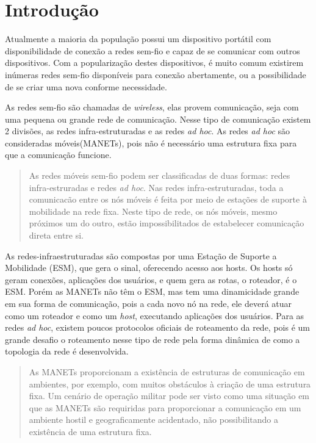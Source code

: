 \section{Introdu\c{c}\~ao} 
Atualmente a maioria da popula\c{c}\~ao possui um dispositivo port\'atil com disponibilidade de conex\~ao a redes sem-fio e capaz de se comunicar com outros dispositivos. Com a populariza\c{c}\~ao destes dispositivos, \'e muito comum existirem in\'umeras redes sem-fio dispon\'iveis para conex\~ao abertamente, ou a possibilidade de se criar uma nova conforme necessidade.

As redes sem-fio s\~ao chamadas de \textit{wireless}, elas provem comunica\c{c}\~ao, seja com uma pequena ou grande rede de comunica\c{c}\~ao. Nesse tipo de comunica\c{c}\~ao existem 2 divis\~oes, as redes infra-estruturadas e as redes \textit{ad hoc}. As redes \textit{ad hoc} s\~ao consideradas m\'oveis(MANETs), pois n\~ao \'e necess\'ario uma estrutura fixa para que a comunica\c{c}\~ao funcione.

\begin{quote}
As redes m\'oveis sem-fio podem ser classificadas de duas formas: redes infra-estruradas e redes \textit{ad hoc}. Nas redes infra-estruturadas, toda a comunicac\~ao entre os n\'os m\'oveis \'e feita por meio de esta\c{c}\~oes de suporte \`a mobilidade na rede fixa. Neste tipo de rede, os n\'os m\'oveis, mesmo pr\'oximos um do outro, est\~ao impossibilitados de estabelecer comunica\c{c}\~ao direta entre si.\cite{pepe}
\end{quote}

As redes-infraestruturadas s\~ao compostas por uma Esta\c{c}\~ao de Suporte a Mobilidade (ESM), que gera o sinal, oferecendo acesso aos hosts. Os hosts s\'o geram conex\~oes, aplica\c{c}\~oes dos usu\'arios, e quem gera as rotas, o roteador, \'e o ESM. Por\'em as MANETs n\~ao t\^em o ESM, mas tem uma dinamicidade grande em sua forma de comunica\c{c}\~ao, pois a cada novo n\'o na rede, ele dever\'a atuar como um roteador e como um \textit{host}, executando aplica\c{c}\~oes dos usu\'arios. Para as redes \textit{ad hoc}, existem poucos protocolos oficiais de roteamento da rede, pois \'e um grande desafio o roteamento nesse tipo de rede pela forma din\^ amica de como a topologia da rede \'e desenvolvida.

\begin{quote}
As MANETs proporcionam a exist\^encia de estruturas de comunica\c{c}\~ao em ambientes, por exemplo, com muitos obst\'aculos \`a cria\c{c}\~ao de uma estrutura fixa. Um cen\'ario de opera\c{c}\~ao militar pode ser visto como uma situa\c{c}\~ao em que as MANETs s\~ao requiridas para proporcionar a comunica\c{c}\~ao em um ambiente hostil e geograficamente acidentado, n\~ao possibilitando a exist\^encia de uma estrutura fixa.\cite{schimidt}
\end{quote}

